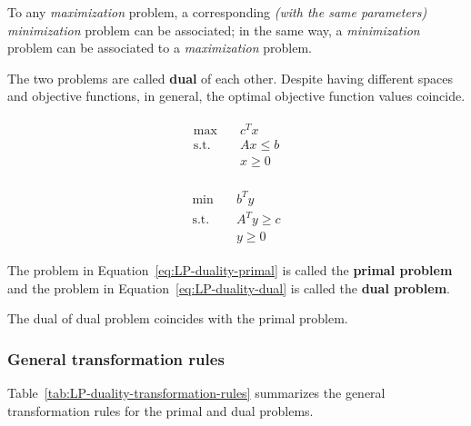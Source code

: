 \documentclass[english]{article}
\begin{document}
To any \textit{maximization} \LP problem, a corresponding \textit{(with the same parameters)} \textit{minimization} problem can be associated;
in the same way, a \textit{minimization} problem can be associated to a \textit{maximization} problem.

The two problems are called \textbf{dual} of each other.
Despite having different spaces and objective functions, in general, the optimal objective function values coincide.

\bigskip
\begin{minipage}{0.3\textwidth}
  \begin{gather}
    \begin{aligned}
      \max        & \quad c^T x     \\
      \text{s.t.} & \quad Ax \leq b \\
                  & \quad x \geq 0
    \end{aligned}
    \label{eq:LP-duality-primal}
  \end{gather}
\end{minipage}
\hspace{0.3\textwidth}
\begin{minipage}{0.3\textwidth}
  \begin{gather}
    \begin{aligned}
      \min        & \quad b^T y        \\
      \text{s.t.} & \quad A^T y \geq c \\
                  & \quad y \geq 0
    \end{aligned}
    \label{eq:LP-duality-dual}
  \end{gather}
\end{minipage}

\bigskip
\begin{definition}
  The problem in Equation~\ref{eq:LP-duality-primal} is called the \textbf{primal problem} and the problem in Equation~\ref{eq:LP-duality-dual} is called the \textbf{dual problem}.
\end{definition}

\begin{property}
  The dual of dual problem coincides with the primal problem.
\end{property}

\subsubsection{General transformation rules}

Table~\ref{tab:LP-duality-transformation-rules} summarizes the general transformation rules for the primal and dual problems.
\end{document}
